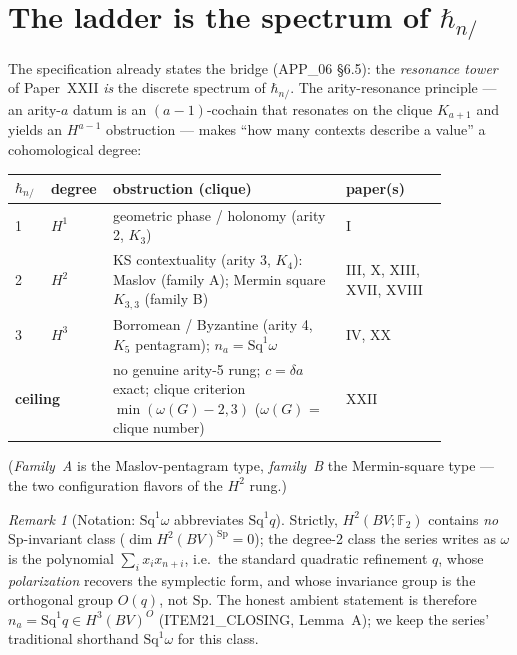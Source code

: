 \documentclass[11pt,a4paper]{article}
\newcommand{\Sp}{\mathrm{Sp}}
\newcommand{\F}{\mathbb{F}}
\newcommand{\hbarn}{\hbar_{n/}}
\newcommand{\Sq}{\mathrm{Sq}}
\theoremstyle{plain}
\theoremstyle{definition}
\theoremstyle{remark}
\newtheorem*{remark}{Remark}
\begin{document}
\section{\texorpdfstring{The ladder is the spectrum of $\hbarn$}{The ladder is the spectrum of h-bar}}
\label{sec:ladder}

The specification already states the bridge (APP\_06 \S6.5): the \emph{resonance
tower} of Paper~XXII \emph{is} the discrete spectrum of $\hbarn$. The
arity-resonance principle --- an arity-$a$ datum is an $(a{-}1)$-cochain that
resonates on the clique $K_{a+1}$ and yields an $H^{a-1}$ obstruction --- makes
``how many contexts describe a value'' a cohomological degree:

\begin{center}
\renewcommand{\arraystretch}{1.3}
\begin{tabular}{p{0.07\linewidth} p{0.07\linewidth} p{0.50\linewidth} p{0.22\linewidth}}
\toprule
$\hbarn$ & degree & obstruction (clique) & paper(s) \\
\midrule
1 & $H^1$ & geometric phase / holonomy (arity 2, $K_3$) & I \\
2 & $H^2$ & KS contextuality (arity 3, $K_4$): Maslov (family A);
           Mermin square $K_{3,3}$ (family B) & III, X, XIII, XVII, XVIII \\
3 & $H^3$ & Borromean / Byzantine (arity 4, $K_5$ pentagram); $n_a=\Sq^1\omega$
        & IV, XX \\
\midrule
\multicolumn{2}{l}{\textbf{ceiling}} &
  no genuine arity-5 rung; $c=\delta a$ exact; clique criterion $\min(\omega(G){-}2,3)$ ($\omega(G)$ = clique number)
        & XXII \\
\bottomrule
\end{tabular}
\end{center}

(\emph{Family~A} is the Maslov-pentagram type, \emph{family~B} the Mermin-square
type --- the two configuration flavors of the $H^2$ rung.)

\begin{remark}[Notation: $\Sq^1\omega$ abbreviates $\Sq^1 q$]
Strictly, $H^2(BV;\F_2)$ contains \emph{no} $\Sp$-invariant class
($\dim H^2(BV)^{\Sp}=0$); the degree-2 class the series writes as $\omega$ is
the polynomial $\sum_i x_ix_{n+i}$, i.e.\ the standard quadratic refinement
$q$, whose \emph{polarization} recovers the symplectic form, and whose
invariance group is the orthogonal group $O(q)$, not $\Sp$. The honest ambient
statement is therefore $n_a=\Sq^1 q\in H^3(BV)^{O}$ (ITEM21\_CLOSING, Lemma~A);
we keep the series' traditional shorthand $\Sq^1\omega$ for this class.
\end{remark}
\end{document}
